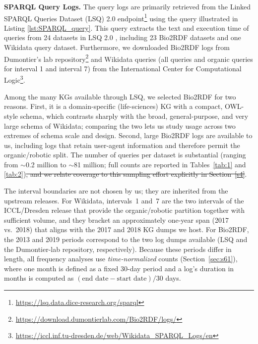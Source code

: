 \documentclass[sw]{iosart2x}
\providecommand{\DIFdel}[1]{{\protect\color{red}\sout{#1}}} %
\providecommand{\DIFdelbegin}{} %
\providecommand{\DIFdelend}{} %
\providecommand{\DIFscaledelfig}{0.5}
\newlength{\DIFdelgraphicswidth} %
\newlength{\DIFdelgraphicsheight} %
\providecommand{\DIFdelincludegraphics}[2][]{%
\sbox{\DIFdelgraphicsbox}{\DIFOincludegraphics[#1]{#2}}%
\settoboxwidth{\DIFdelgraphicswidth}{\DIFdelgraphicsbox} %
\settoboxtotalheight{\DIFdelgraphicsheight}{\DIFdelgraphicsbox} %
\scalebox{\DIFscaledelfig}{%
\parbox[b]{\DIFdelgraphicswidth}{\usebox{\DIFdelgraphicsbox}\\[-\baselineskip] \rule{\DIFdelgraphicswidth}{0em}}\llap{\resizebox{\DIFdelgraphicswidth}{\DIFdelgraphicsheight}{%
\setlength{\unitlength}{\DIFdelgraphicswidth}%
\begin{picture}(1,1)%
\thicklines\linethickness{2pt} %
{\color[rgb]{1,0,0}\put(0,0){\framebox(1,1){}}}%
{\color[rgb]{1,0,0}\put(0,0){\line( 1,1){1}}}%
{\color[rgb]{1,0,0}\put(0,1){\line(1,-1){1}}}%
\end{picture}%
}\hspace*{3pt}}} %
} %
\DeclareRobustCommand{\DIFdelbegin}{\DIFOdelbegin \let\includegraphics\DIFdelincludegraphics} %
\DeclareRobustCommand{\DIFdelend}{\DIFOaddend \let\includegraphics\DIFOincludegraphics} %
\begin{document}
\textbf{SPARQL Query Logs. }
The query logs are primarily retrieved from the Linked SPARQL Queries Dataset (LSQ) 2.0 endpoint\footnote{\url{https://lsq.data.dice-research.org/sparql}} using the query illustrated in Listing \ref{lst:SPARQL_query}. This query extracts the text and execution time of queries from 24 datasets in LSQ 2.0 \cite{stadler2024lsq}, including 23 Bio2RDF datasets and one Wikidata query dataset.
Furthermore, we downloaded Bio2RDF logs from Dumontier’s lab repository\footnote{\url{https://download.dumontierlab.com/Bio2RDF/logs/}} and Wikidata queries (all queries and organic queries for interval 1 and interval 7) from the International Center for Computational Logic\footnote{\url{https://iccl.inf.tu-dresden.de/web/Wikidata_SPARQL_Logs/en}}.

Among the many KGs available through LSQ, we selected Bio2RDF for two reasons. First, it is a domain-specific (life-sciences) KG with a compact, OWL-style schema, which contrasts sharply with the broad, general-purpose, and very large schema of Wikidata; comparing the two lets us study usage across two extremes of schema scale and design. Second, large Bio2RDF logs are available to us, including logs that retain user-agent information and therefore permit the organic/robotic split. The number of queries per dataset is substantial (ranging from $\sim$0.2 million to $\sim$81 million; full counts are reported in Tables~\ref{tab:1} and \ref{tab:2})\DIFdelbegin \DIFdel{, and we relate coverage to this sampling effort explicitly in Section~\ref{s4}}\DIFdelend .

The interval boundaries are not chosen by us; they are inherited from the upstream releases. For Wikidata, intervals~1 and~7 are the two intervals of the ICCL/Dresden release that provide the organic/robotic partition together with sufficient volume, and they bracket an approximately one-year span (2017 vs.\ 2018) that aligns with the 2017 and 2018 KG dumps we host. For Bio2RDF, the 2013 and 2019 periods correspond to the two log dumps available (LSQ and the Dumontier-lab repository, respectively). Because these periods differ in length, all frequency analyses use \emph{time-normalized} counts (Section~\ref{sec:s61}), where one month is defined as a fixed 30-day period and a log's duration in months is computed as $(\text{end date}-\text{start date})/30$ days.
\end{document}
